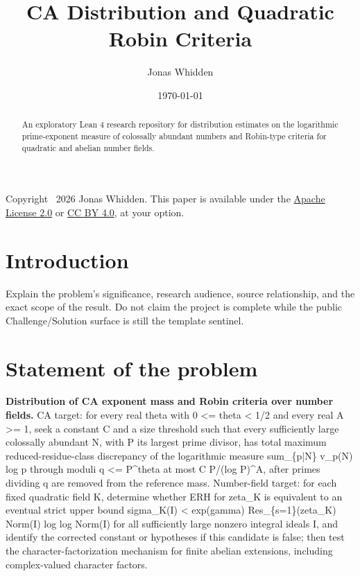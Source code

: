 \documentclass[11pt]{amsart}
\title{CA Distribution and Quadratic Robin Criteria}
\author{Jonas Whidden}
\date{\today}
\theoremstyle{definition}
\theoremstyle{remark}
\begin{document}
\begin{abstract}
An exploratory Lean 4 research repository for distribution estimates on the logarithmic prime-exponent measure of colossally abundant numbers and Robin-type criteria for quadratic and abelian number fields.
\end{abstract}

\maketitle

\begin{center}
\small
Copyright \textcopyright\ 2026 Jonas Whidden. This paper is available under
the \href{https://www.apache.org/licenses/LICENSE-2.0}{Apache License 2.0} or
\href{https://creativecommons.org/licenses/by/4.0/}{CC BY 4.0}, at your option.
\end{center}

\section{Introduction}

Explain the problem's significance, research audience, source relationship,
and the exact scope of the result. Do not claim the project is complete while
the public Challenge/Solution surface is still the template sentinel.

\section{Statement of the problem}

\textbf{Distribution of CA exponent mass and Robin criteria over number fields.} CA target: for every real theta with 0 <= theta < 1/2 and every real A >= 1, seek a constant C and a size threshold such that every sufficiently large colossally abundant N, with P its largest prime divisor, has total maximum reduced-residue-class discrepancy of the logarithmic measure sum\_\{p|N\} v\_p(N) log p through moduli q <= P\textasciicircum{}theta at most C P/(log P)\textasciicircum{}A, after primes dividing q are removed from the reference mass. Number-field target: for each fixed quadratic field K, determine whether ERH for zeta\_K is equivalent to an eventual strict upper bound sigma\_K(I) < exp(gamma) Res\_\{s=1\}(zeta\_K) Norm(I) log log Norm(I) for all sufficiently large nonzero integral ideals I, and identify the corrected constant or hypotheses if this candidate is false; then test the character-factorization mechanism for finite abelian extensions, including complex-valued character factors.
\end{document}
